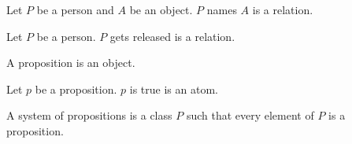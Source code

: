 
\begin{forthel}
  \begin{signature*}
    Let $P$ be a person and $A$ be an object.
    $P$ names $A$ is a relation.
  \end{signature*}

  \begin{signature*}
    Let $P$ be a person.
    $P$ gets released is a relation.
  \end{signature*}
\end{forthel}



\begin{forthel}
  \begin{signature*}
    A proposition is an object.
  \end{signature*}

  \begin{signature*}
    Let $p$ be a proposition.
    $p$ is true is an atom.
  \end{signature*}

  \begin{definition*}
    A system of propositions is a class $P$ such that every element of $P$ is a proposition.
  \end{definition*}
\end{forthel}
